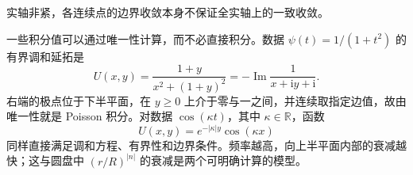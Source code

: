 \ProseParagraphBreak
实轴非紧，各连续点的边界收敛本身不保证全实轴上的一致收敛。

\ProseParagraphBreak
一些积分值可以通过唯一性计算，而不必直接积分。数据
\(\psi(t)=1/(1+t^2)\) 的有界调和延拓是
\[
 U(x,y)=\frac{1+y}{x^2+(1+y)^2}
       =-\operatorname{Im}\frac1{x+\mathrm i y+\mathrm i}.
\]
右端的极点位于下半平面，在 \(y\ge0\) 上介于零与一之间，并连续取指定边值，故由唯一性就是 Poisson 积分。对数据 \(\cos(\kappa t)\)，其中 \(\kappa\in\mathbb R\)，函数
\[
 U(x,y)=e^{-|\kappa|y}\cos(\kappa x)
\]
同样直接满足调和方程、有界性和边界条件。频率越高，向上半平面内部的衰减越快；这与圆盘中 \((r/R)^{|n|}\) 的衰减是两个可明确计算的模型。
